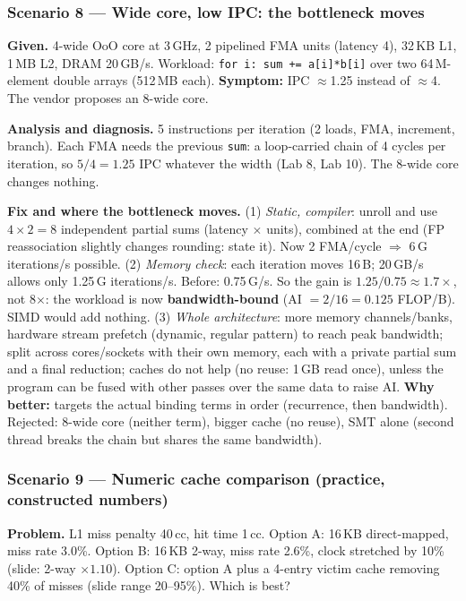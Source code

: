 \subsubsection*{Scenario 8 --- Wide core, low IPC: the bottleneck moves}
\textbf{Given.} 4-wide OoO core at 3\,GHz, 2 pipelined FMA units (latency 4), 32\,KB L1, 1\,MB L2, DRAM 20\,GB/s. Workload: \texttt{for i: sum += a[i]*b[i]} over two 64\,M-element double arrays (512\,MB each). \textbf{Symptom:} IPC $\approx$1.25 instead of $\approx$4. The vendor proposes an 8-wide core.

\textbf{Analysis and diagnosis.} 5 instructions per iteration (2 loads, FMA, increment, branch). Each FMA needs the previous \texttt{sum}: a loop-carried chain of 4 cycles per iteration, so $5/4=1.25$ IPC whatever the width (Lab 8, Lab 10). The 8-wide core changes nothing.

\textbf{Fix and where the bottleneck moves.}
(1) \emph{Static, compiler}: unroll and use $4\times2=8$ independent partial sums (latency $\times$ units), combined at the end (FP reassociation slightly changes rounding: state it). Now 2 FMA/cycle $\Rightarrow$ 6\,G iterations/s possible.
(2) \emph{Memory check}: each iteration moves 16\,B; 20\,GB/s allows only 1.25\,G iterations/s. Before: 0.75\,G/s. So the gain is $1.25/0.75\approx1.7\times$, not 8$\times$: the workload is now \textbf{bandwidth-bound} (AI $=2/16=0.125$ FLOP/B). SIMD would add nothing.
(3) \emph{Whole architecture}: more memory channels/banks, hardware stream prefetch (dynamic, regular pattern) to reach peak bandwidth; split across cores/sockets with their own memory, each with a private partial sum and a final reduction; caches do not help (no reuse: 1\,GB read once), unless the program can be fused with other passes over the same data to raise AI.
\textbf{Why better:} targets the actual binding terms in order (recurrence, then bandwidth). Rejected: 8-wide core (neither term), bigger cache (no reuse), SMT alone (second thread breaks the chain but shares the same bandwidth).

\subsubsection*{Scenario 9 --- Numeric cache comparison (practice, constructed numbers)}
\textbf{Problem.} L1 miss penalty 40\,cc, hit time 1\,cc. Option A: 16\,KB direct-mapped, miss rate 3.0\%. Option B: 16\,KB 2-way, miss rate 2.6\%, clock stretched by 10\% (slide: 2-way $\times1.10$). Option C: option A plus a 4-entry victim cache removing 40\% of misses (slide range 20--95\%). Which is best?

